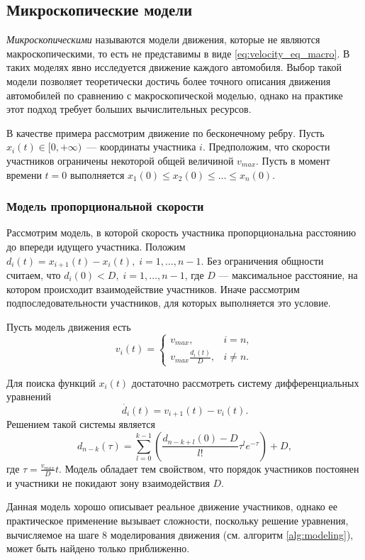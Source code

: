 \documentclass[12pt, a4paper]{article}
\begin{document}
\subsection{Микроскопические модели}
\textit {Микроскопическими} называются модели движения, которые не являются макроскопическими, то есть не представимы в виде \eqref{eq:velocity_eq_macro}. В таких моделях явно исследуется движение каждого автомобиля.
Выбор такой модели позволяет теоретически достичь более точного описания движения автомобилей по сравнению с макроскопической моделью, однако на практике этот подход требует больших вычислительных ресурсов.

В качестве примера рассмотрим движение по бесконечному ребру. Пусть ${x_i(t) \in [0, +\infty)}$~--- координаты участника $i$. Предположим, что скорости участников ограничены некоторой общей величиной $v_{max}$. Пусть в момент времени ${t = 0}$ выполняется $x_1(0) \le x_2(0) \le \dots \le x_n(0)$.

\subsubsection*{Модель пропорциональной скорости}
Рассмотрим модель, в которой скорость участника пропорциональна расстоянию до впереди идущего участника.
Положим $d_{i} (t) = x_{i + 1} (t) - x_{i} (t), \; i = 1, \dots, n - 1$.
Без ограничения общности считаем, что $d_{i} (0) < D, \; i = 1, \dots, n - 1$, где $D$ --- максимальное расстояние, на котором происходит взаимодействие участников. Иначе рассмотрим подпоследовательности участников, для которых выполняется это условие.

Пусть модель движения есть
\begin{equation}
	\label{eq:micro}
	v_i(t)=
	\begin{cases}
		v_{max}, & i = n,
		\\
		v_{max} \frac{d_i(t)}{D} ,& i \ne n.
	\end{cases}
\end{equation}

Для поиска функций $x_i(t)$ достаточно рассмотреть систему дифференциальных уравнений
$$ \dot{d_i} (t) = v_{i + 1} (t) - v_i (t).$$
Решением такой системы является
$$d_{n - k} (\tau) = \sum \limits_{l = 0} ^ {k - 1} \left(\frac{d_{n - k + l} (0) - D}{l!} \tau^l e ^ {-\tau}\right) + D ,$$
где ${\tau = \frac{v_{max}}{D}t}$. Модель обладает тем свойством, что порядок участников постоянен и участники не покидают зону взаимодействия $D$. 

Данная модель хорошо описывает реальное движение участников, однако ее практическое применение вызывает сложности, поскольку решение уравнения, вычисляемое на шаге 8 моделирования движения (см. алгоритм \ref{alg:modeling}), может быть найдено только приближенно.
\end{document}
